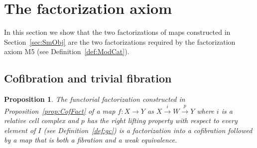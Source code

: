 \documentclass{amsart}
\numberwithin{equation}{section}
\theoremstyle{slplain}
\newtheorem{prop}[equation]{Proposition}
\theoremstyle{definition}
\theoremstyle{remark}
\newcommand{\propref}{Proposition~\ref}
\newcommand{\defref}{Definition~\ref}
\newcommand{\secref}{Section~\ref}
\begin{document}
\section{The factorization axiom}
\label{sec:factor}

In this section we show that the two factorizations of maps
constructed in \secref{sec:SmObj} are the two factorizations required
by the factorization axiom M5 (see \defref{def:ModCat}).

\subsection{Cofibration and trivial fibration}
\label{sec:CofTrFib}

\begin{prop}
  \label{prop:CofTrFib}
  The functorial factorization constructed in \propref{prop:CofFact}
  of a map $f\colon X \to Y$ as $X \xrightarrow{i} W \xrightarrow{p}
  Y$ where $i$ is a relative cell complex and $p$ has the right
  lifting property with respect to every element of $I$ (see
  \defref{def:gc}) is a factorization into a cofibration followed by a
  map that is both a fibration and a weak equivalence.
\end{prop}
\end{document}
